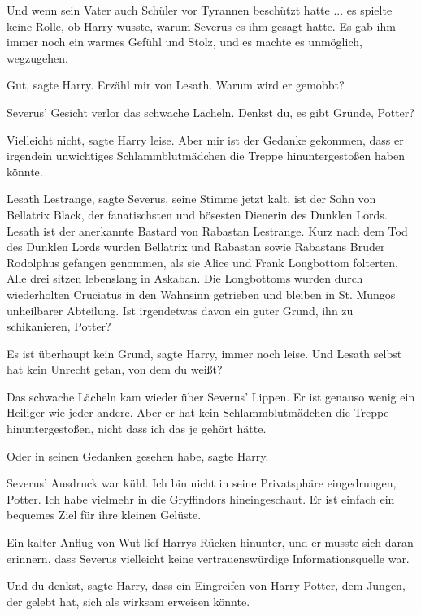 Und wenn sein Vater auch Schüler vor Tyrannen beschützt hatte ... es spielte
keine Rolle, ob Harry wusste, warum Severus es ihm gesagt hatte. Es gab ihm
immer noch ein warmes Gefühl und Stolz, und es machte es unmöglich, wegzugehen.

\glqq{}Gut\grqq{}, sagte Harry. \glqq{}Erzähl mir von Lesath. Warum wird er
gemobbt?\grqq{}

Severus' Gesicht verlor das schwache Lächeln. \glqq{}Denkst du, es gibt Gründe,
Potter?\grqq{}

\glqq{}Vielleicht nicht\grqq{}, sagte Harry leise. \glqq{}Aber mir ist der
Gedanke gekommen, dass er irgendein unwichtiges Schlammblutmädchen die Treppe
hinuntergestoßen haben könnte.\grqq{}

\glqq{}Lesath Lestrange\grqq{}, sagte Severus, seine Stimme jetzt kalt,
\glqq{}ist der Sohn von Bellatrix Black, der fanatischsten und bösesten Dienerin
des Dunklen Lords. Lesath ist der anerkannte Bastard von Rabastan Lestrange.
Kurz nach dem Tod des Dunklen Lords wurden Bellatrix und Rabastan sowie
Rabastans Bruder Rodolphus gefangen genommen, als sie Alice und Frank Longbottom
folterten. Alle drei sitzen lebenslang in Askaban. Die Longbottoms wurden durch
wiederholten Cruciatus in den Wahnsinn getrieben und bleiben in St. Mungos
unheilbarer Abteilung. Ist irgendetwas davon ein guter Grund, ihn zu
schikanieren, Potter?\grqq{}

\glqq{}Es ist überhaupt kein Grund\grqq{}, sagte Harry, immer noch leise.
\glqq{}Und Lesath selbst hat kein Unrecht getan, von dem du weißt?\grqq{}

Das schwache Lächeln kam wieder über Severus' Lippen. \glqq{}Er ist genauso
wenig ein Heiliger wie jeder andere. Aber er hat kein Schlammblutmädchen die
Treppe hinuntergestoßen, nicht dass ich das je gehört hätte.\grqq{}

\glqq{}Oder in seinen Gedanken gesehen habe\grqq{}, sagte Harry.

Severus' Ausdruck war kühl. \glqq{}Ich bin nicht in seine Privatsphäre
eingedrungen, Potter. Ich habe vielmehr in die Gryffindors hineingeschaut. Er
ist einfach ein bequemes Ziel für ihre kleinen Gelüste.\grqq{}

Ein kalter Anflug von Wut lief Harrys Rücken hinunter, und er musste sich daran
erinnern, dass Severus vielleicht keine vertrauenswürdige Informationsquelle
war.

\glqq{}Und du denkst\grqq{}, sagte Harry, \glqq{}dass ein Eingreifen von Harry
Potter, dem Jungen, der gelebt hat, sich als wirksam erweisen könnte.\grqq{}

